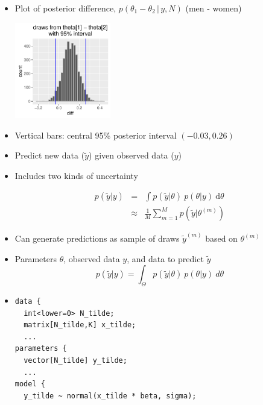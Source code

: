 \documentclass[10pt]{report}
\begin{document}
%
\begin{itemize}
\item Plot of posterior difference, $p(\theta_1 - \theta_2 \, | \, y,
  N)$ (men - women)
\begin{center}
\includegraphics[height=1.65in]{img/lefty-posterior.pdf}
\end{center}
\item Vertical bars: central 95\% posterior interval $(-0.03,0.26)$
\end{itemize}




%
\begin{itemize}
\item Predict new data ($\tilde{y}$) given observed data ($y$)
\item Includes two kinds of uncertainty
\vspace*{-8pt}\begin{eqnarray*}
p(\tilde{y} |  y)
& = & \int p(\tilde{y} | \theta)
           \ p(\theta | y)
           \ \mathrm{d}\theta
\\[4pt]
& \approx & \frac{1}{M} \sum_{m=1}^M p(\tilde{y} | \theta^{(m)})
\end{eqnarray*}
\item Can generate predictions as sample of draws $\tilde{y}^{(m)}$
  based on $\theta^{(m)}$
\end{itemize}


%
\begin{itemize}
\item Parameters $\theta$, observed data $y$, and data to predict $\tilde{y}$
\[
p(\tilde{y}|y) = \int_{\Theta} p(\tilde{y}|\theta) \ p(\theta|y) \ d\theta
\]
\item 
{\small
\begin{Verbatim}
data {
  int<lower=0> N_tilde;
  matrix[N_tilde,K] x_tilde;
  ...
parameters {
  vector[N_tilde] y_tilde;
  ...
model {
  y_tilde ~ normal(x_tilde * beta, sigma);
\end{Verbatim}
}
\end{itemize}
\end{document}
